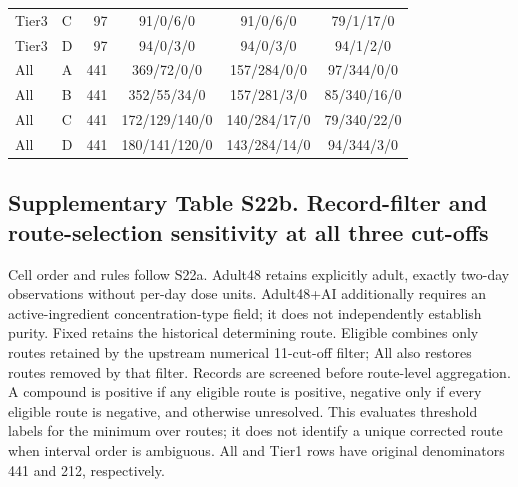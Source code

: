 \begin{longtable}{llrccc}
Tier3 & C & 97 & 91/0/6/0 & 91/0/6/0 & 79/1/17/0 \\

Tier3 & D & 97 & 94/0/3/0 & 94/0/3/0 & 94/1/2/0 \\

All & A & 441 & 369/72/0/0 & 157/284/0/0 & 97/344/0/0 \\

All & B & 441 & 352/55/34/0 & 157/281/3/0 & 85/340/16/0 \\

All & C & 441 & 172/129/140/0 & 140/284/17/0 & 79/340/22/0 \\

All & D & 441 & 180/141/120/0 & 143/284/14/0 & 94/344/3/0 \\

\end{longtable}\endgroup

\subsection*{Supplementary Table S22b. Record-filter and route-selection sensitivity at all three cut-offs}

Cell order and rules follow S22a. Adult48 retains explicitly adult, exactly two-day observations without per-day dose units. Adult48+AI additionally requires an active-ingredient concentration-type field; it does not independently establish purity. Fixed retains the historical determining route. Eligible combines only routes retained by the upstream numerical 11-cut-off filter; All also restores routes removed by that filter. Records are screened before route-level aggregation. A compound is positive if any eligible route is positive, negative only if every eligible route is negative, and otherwise unresolved. This evaluates threshold labels for the minimum over routes; it does not identify a unique corrected route when interval order is ambiguous. All and Tier1 rows have original denominators 441 and 212, respectively.

\begingroup\fontsize{8.5}{10.2}\selectfont\setlength{\tabcolsep}{3.5pt}

